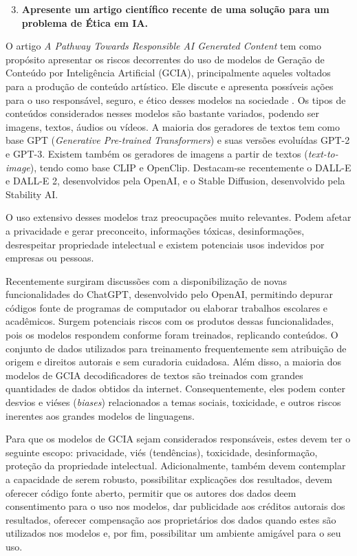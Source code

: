 \begin{enumerate}\setcounter{enumi}{2}\bfseries
    \item  \textbf{Apresente um artigo científico recente de uma solução para um problema de Ética em IA.}
\end{enumerate}

O artigo \textit{A Pathway Towards Responsible AI Generated Content} tem como propósito apresentar 
os riscos decorrentes do uso de modelos de Geração de Conteúdo por Inteligência Artificial (GCIA), 
principalmente aqueles voltados para a produção de conteúdo artístico. 
Ele discute e apresenta possíveis ações para o uso responsável, seguro, e ético desses modelos na 
sociedade \cite{chen2023pathway}.
Os tipos de conteúdos considerados nesses modelos são bastante variados, podendo ser imagens, textos, 
áudios ou vídeos. A maioria dos geradores de textos tem como base GPT
(\textit{Generative Pre-trained Transformers}) e suas versões evoluídas GPT-2 e GPT-3. 
Existem também os geradores de imagens a partir de textos (\textit{text-to-image}), tendo  
como base CLIP e OpenClip. Destacam-se 
recentemente o DALL-E e DALL-E 2, desenvolvidos pela OpenAI, e o Stable Diffusion, desenvolvido pela 
Stability AI.

O uso extensivo desses modelos traz preocupações muito relevantes. Podem afetar a privacidade e
gerar preconceito, informações tóxicas, desinformações, desrespeitar propriedade intelectual e 
existem potenciais usos indevidos por empresas ou pessoas. 

Recentemente surgiram discussões com a disponibilização de novas funcionalidades do ChatGPT, desenvolvido 
pelo OpenAI, permitindo depurar códigos fonte de programas de 
computador ou elaborar trabalhos escolares e acadêmicos. Surgem potenciais riscos com os produtos dessas funcionalidades, 
pois os modelos respondem conforme foram treinados, replicando conteúdos.
O conjunto de dados utilizados para treinamento frequentemente sem atribuição de origem e direitos autorais e sem curadoria cuidadosa. 
Além disso, a maioria dos modelos de GCIA decodificadores de textos são treinados com grandes quantidades 
de dados obtidos da internet. Consequentemente, eles podem conter desvios e viéses (\textit{biases}) relacionados a temas sociais, toxicidade, 
e outros riscos inerentes aos grandes modelos de linguagens.

Para que os modelos de GCIA sejam considerados responsáveis, estes devem ter o seguinte escopo: 
privacidade, viés (tendências), toxicidade, desinformação, proteção da propriedade intelectual. 
Adicionalmente, também devem contemplar a capacidade de serem robusto, possibilitar explicações dos resultados,
devem oferecer código fonte aberto, permitir que os autores dos dados deem consentimento para o uso nos modelos, 
dar publicidade aos créditos autorais dos resultados, oferecer compensação aos proprietários dos dados quando 
estes são utilizados nos modelos e, por fim, possibilitar um ambiente amigável para o seu uso.

